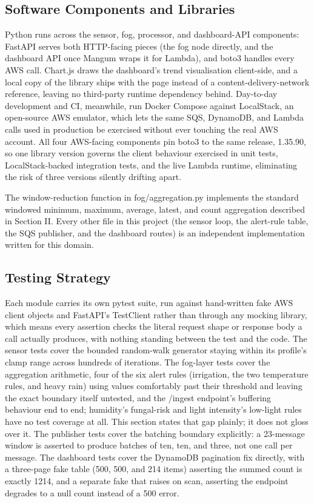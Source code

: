 \documentclass[conference]{IEEEtran}
\begin{document}
\subsection{Software Components and Libraries}
Python runs across the sensor, fog, processor, and dashboard-API components: FastAPI serves both HTTP-facing pieces (the fog node directly, and the dashboard API once Mangum wraps it for Lambda), and boto3 handles every AWS call. Chart.js draws the dashboard's trend visualisation client-side, and a local copy of the library ships with the page instead of a content-delivery-network reference, leaving no third-party runtime dependency behind. Day-to-day development and CI, meanwhile, run Docker Compose against LocalStack, an open-source AWS emulator, which lets the same SQS, DynamoDB, and Lambda calls used in production be exercised without ever touching the real AWS account. All four AWS-facing components pin boto3 to the same release, 1.35.90, so one library version governs the client behaviour exercised in unit tests, LocalStack-backed integration tests, and the live Lambda runtime, eliminating the risk of three versions silently drifting apart.

The window-reduction function in fog/aggregation.py implements the standard windowed minimum, maximum, average, latest, and count aggregation described in Section II. Every other file in this project (the sensor loop, the alert-rule table, the SQS publisher, and the dashboard routes) is an independent implementation written for this domain.

\subsection{Testing Strategy}
Each module carries its own pytest suite, run against hand-written fake AWS client objects and FastAPI's TestClient rather than through any mocking library, which means every assertion checks the literal request shape or response body a call actually produces, with nothing standing between the test and the code. The sensor tests cover the bounded random-walk generator staying within its profile's clamp range across hundreds of iterations. The fog-layer tests cover the aggregation arithmetic, four of the six alert rules (irrigation, the two temperature rules, and heavy rain) using values comfortably past their threshold and leaving the exact boundary itself untested, and the /ingest endpoint's buffering behaviour end to end; humidity's fungal-risk and light intensity's low-light rules have no test coverage at all. This section states that gap plainly; it does not gloss over it. The publisher tests cover the batching boundary explicitly: a 23-message window is asserted to produce batches of ten, ten, and three, not one call per message. The dashboard tests cover the DynamoDB pagination fix directly, with a three-page fake table (500, 500, and 214 items) asserting the summed count is exactly 1214, and a separate fake that raises on scan, asserting the endpoint degrades to a null count instead of a 500 error.
\end{document}
